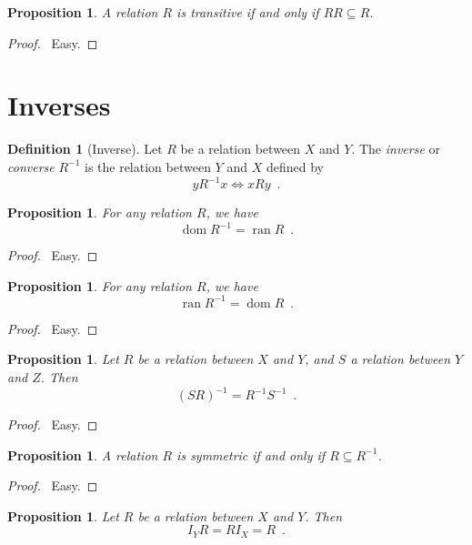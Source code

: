 \documentclass{report}
\let\qed\relax
\newtheorem{prop}[ax]{Proposition}
\theoremstyle{definition}
\newtheorem{df}[ax]{Definition}
\newcommand{\dom}{\ensuremath{\operatorname{dom}}}
\newcommand{\ran}{\ensuremath{\operatorname{ran}}}
\begin{document}
\begin{prop}
A relation $R$ is transitive if and only if $RR \subseteq R$.
\end{prop}

\begin{proof}
\pf\ Easy. \qed
\end{proof}

\section{Inverses}

\begin{df}[Inverse]
Let $R$ be a relation between $X$ and $Y$. The \emph{inverse} or \emph{converse} $R^{-1}$ is the relation between $Y$ and $X$ defined by
\[ y R^{-1} x \Leftrightarrow x R y \enspace . \]
\end{df}

\begin{prop}
For any relation $R$, we have
\[ \dom R^{-1} = \ran R \enspace . \]
\end{prop}

\begin{proof}
\pf\ Easy. \qed
\end{proof}

\begin{prop}
For any relation $R$, we have
\[ \ran R^{-1} = \dom R \enspace . \]
\end{prop}

\begin{proof}
\pf\ Easy. \qed
\end{proof}

\begin{prop}
Let $R$ be a relation between $X$ and $Y$, and $S$ a relation between $Y$ and $Z$. Then
\[ (SR)^{-1} = R^{-1}S^{-1} \enspace . \]
\end{prop}

\begin{proof}
\pf\ Easy. \qed
\end{proof}

\begin{prop}
A relation $R$ is symmetric if and only if $R \subseteq R^{-1}$.
\end{prop}

\begin{proof}
\pf\ Easy. \qed
\end{proof}

\begin{prop}
Let $R$ be a relation between $X$ and $Y$. Then
\[ I_Y R = R I_X = R \enspace . \]
\end{prop}
\end{document}

